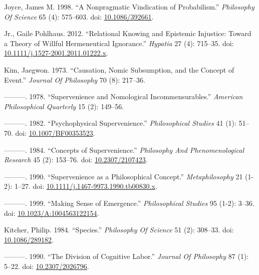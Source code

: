 \documentclass[
  10pt,
  letterpaper,
  DIV=11,
  numbers=noendperiod,
  twoside]{scrartcl}
\newlength{\cslhangindent}
\newenvironment{CSLReferences}[2] %
 {\begin{list}{}{%
  \setlength{\itemindent}{0pt}
  \setlength{\leftmargin}{0pt}
  \setlength{\parsep}{0pt}
  \ifodd #1
   \setlength{\leftmargin}{\cslhangindent}
   \setlength{\itemindent}{-1\cslhangindent}
  \fi
  \setlength{\itemsep}{#2\baselineskip}}}
 {\end{list}}
\begin{document}
\begin{CSLReferences}{1}{0}
Joyce, James M. 1998. {``A Nonpragmatic Vindication of Probabilism.''}
\emph{Philosophy Of Science} 65 (4): 575--603. doi:
\href{https://doi.org/10.1086/392661}{10.1086/392661}.

Jr., Gaile Pohlhaus. 2012. {``Relational Knowing and Epistemic
Injustice: Toward a Theory of Willful Hermeneutical Ignorance.''}
\emph{Hypatia} 27 (4): 715--35. doi:
\href{https://doi.org/10.1111/j.1527-2001.2011.01222.x}{10.1111/j.1527-2001.2011.01222.x}.

Kim, Jaegwon. 1973. {``Causation, Nomic Subsumption, and the Concept of
Event.''} \emph{Journal Of Philosophy} 70 (8): 217--36.

---------. 1978. {``Supervenience and Nomological Incommensurables.''}
\emph{American Philosophical Quarterly} 15 (2): 149--56.

---------. 1982. {``Psychophysical Supervenience.''} \emph{Philosophical
Studies} 41 (1): 51--70. doi:
\href{https://doi.org/10.1007/BF00353523}{10.1007/BF00353523}.

---------. 1984. {``Concepts of Supervenience.''} \emph{Philosophy And
Phenomenological Research} 45 (2): 153--76. doi:
\href{https://doi.org/10.2307/2107423}{10.2307/2107423}.

---------. 1990. {``Supervenience as a Philosophical Concept.''}
\emph{Metaphilosophy} 21 (1-2): 1--27. doi:
\href{https://doi.org/10.1111/j.1467-9973.1990.tb00830.x}{10.1111/j.1467-9973.1990.tb00830.x}.

---------. 1999. {``Making Sense of Emergence.''} \emph{Philosophical
Studies} 95 (1-2): 3--36. doi:
\href{https://doi.org/10.1023/A:1004563122154}{10.1023/A:1004563122154}.

Kitcher, Philip. 1984. {``Species.''} \emph{Philosophy Of Science} 51
(2): 308--33. doi:
\href{https://doi.org/10.1086/289182}{10.1086/289182}.

---------. 1990. {``The Division of Cognitive Labor.''} \emph{Journal Of
Philosophy} 87 (1): 5--22. doi:
\href{https://doi.org/10.2307/2026796}{10.2307/2026796}.


\end{CSLReferences}
\end{document}
